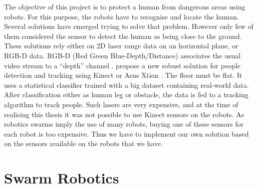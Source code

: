 \documentclass[oneside, a4paper, 12pt]{memoir}
\begin{document}
		The objective of this project is to protect a human from dangerous areas using robots. For this purpose, the robots have to recognise and locate the human. Several solutions have emerged trying to solve that problem. However only few of them considered the sensor to detect the human as being close to the ground. These solutions rely either on 2D laser range data on an horizontal plane, or RGB-D data. RGB-D (Red Green Blue-Depth/Distance) associates the usual video stream to a \enquote{depth} channel \citep{wiki:004}. \citet{gritti2014kinect} propose a new robust solution for people detection and tracking using Kinect \citep{kinect} or Asus Xtion \citep{asus}. The floor must be flat. It uses a statistical classifier trained with a big dataset containing real-world data. After classification either as human leg or obstacle, the data is fed to a tracking algorithm to track people. Such lasers are very expensive, and at the time of realising this thesis it was not possible to use Kinect sensors on the robots. As robotics swarms imply the use of many robots, buying one of these sensors for each robot is too expensive. Thus we have to implement our own solution based on the sensors available on the robots that we have.
		
	\section{Swarm Robotics}

	
\end{document}

